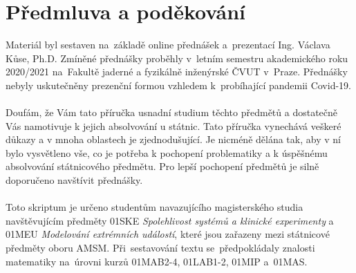 \chapter*{Předmluva a poděkování}

Materiál byl sestaven na~základě online přednášek a~prezentací Ing. Václava Kůse, Ph.D. Zmíněné přednášky proběhly v~letním semestru akademického roku 2020/2021 na~Fakultě jaderné a fyzikálně inženýrské ČVUT v~Praze. Přednášky nebyly uskutečněny prezenční formou vzhledem k~probíhající pandemii Covid-19.
\\ \\
Doufám, že Vám tato příručka usnadní studium těchto předmětů a dostatečně Vás namotivuje k jejich absolvování u státnic. Tato příručka vynechává veškeré důkazy a v mnoha oblastech je zjednodušující. Je nicméně dělána tak, aby v ní bylo vysvětleno vše, co je potřeba k pochopení problematiky a k úspěšnému absolvování státnicového předmětu. Pro lepší pochopení předmětů je silně doporučeno navštívit přednášky.
\\ \\
Toto skriptum je určeno studentům navazujícího magisterského studia navštěvujícím předměty 01SKE\emph{ Spolehlivost systémů a klinické experimenty} a 01MEU\emph{ Modelování extrémních událostí}, které jsou zařazeny mezi státnicové předměty oboru AMSM. Při~sestavování textu se~předpokládaly znalosti matematiky na~úrovni kurzů 01MAB2-4, 01LAB1-2, 01MIP a~01MAS.
